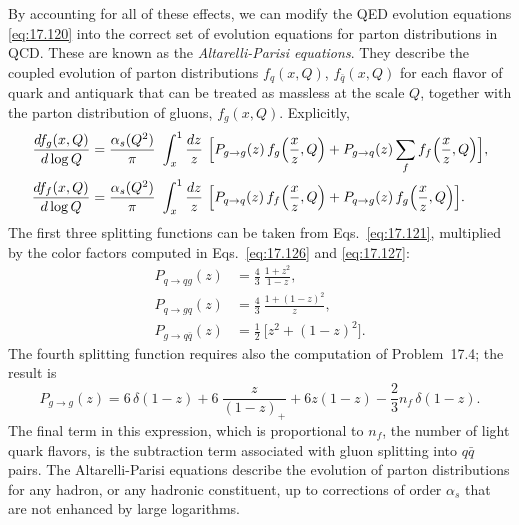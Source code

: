 By accounting for all of these effects, we can modify the QED evolution
equations \eqref{eq:17.120} into the correct set of evolution equations for
parton distributions in QCD.  These are known as the \emph{Altarelli-Parisi
equations}.  They describe the coupled evolution of parton distributions
$f_q(x,Q)$, $f_{\bar{q}}(x,Q)$ for each flavor of quark and antiquark that
can be treated as massless at the scale $Q$, together with the parton
distribution of gluons, $f_g(x,Q)$.  Explicitly,
\begin{equation}
  \begin{aligned}
    \frac{df_g(x,Q)}{d\log Q} &= \frac{\alpha_s(Q^2)}{\pi}\ \int_x^1
      \frac{dz}{z}\ \Bigl[ P_{g\to g}(z)\,f_g\Bigl( \frac{x}{z}, Q \Bigr)
      + P_{g\to q}(z)\sum_f f_f\Bigl( \frac{x}{z}, Q \Bigr) \Bigr],\\
    \frac{df_f(x,Q)}{d\log Q} &= \frac{\alpha_s(Q^2)}{\pi}\ \int_x^1
      \frac{dz}{z}\ \Bigl[ P_{q\to q}(z)\,f_f\Bigl( \frac{x}{z}, Q \Bigr)
      + P_{q\to g}(z)\,f_g\Bigl( \frac{x}{z}, Q \Bigr) \Bigr] .
  \end{aligned}
  \label{eq:17.128}
\end{equation}
The first three splitting functions can be taken from Eqs.~\eqref{eq:17.121},
multiplied by the color factors computed in Eqs.~\eqref{eq:17.126} and
\eqref{eq:17.127}:
\begin{equation}
  \begin{aligned}
    P_{q\to qg}(z) &= \frac{4}{3}\ \frac{1+z^2}{1-z},\\
    P_{q\to gq}(z) &= \frac{4}{3}\ \frac{1+(1-z)^2}{z},\\
    P_{g\to q\bar{q}}(z) &= \frac{1}{2}\ \bigl[ z^2 + (1-z)^2 \bigr] .
  \end{aligned}
  \label{eq:17.129}
\end{equation}
The fourth splitting function requires also the computation of Problem~17.4;
the result is
\begin{equation}
  P_{g\to g}(z) = 6\,\delta(1-z) + 6\ \frac{z}{(1-z)_+}
    + 6z(1-z) - \frac{2}{3}n_f\,\delta(1-z) .
  \label{eq:17.130}
\end{equation}
The final term in this expression, which is proportional to $n_f$, the number
of light quark flavors, is the subtraction term associated with gluon
splitting into $q\bar{q}$ pairs.  The Altarelli-Parisi equations describe the
evolution of parton distributions for any hadron, or any hadronic
constituent, up to corrections of order $\alpha_s$ that are not enhanced by
large logarithms.

